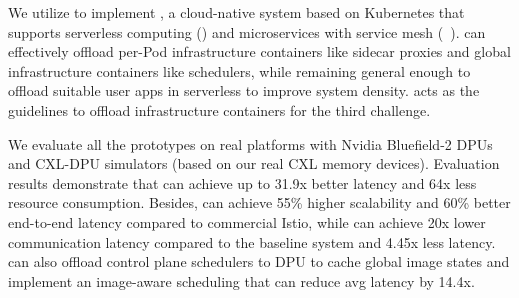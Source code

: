 We utilize \xpod to implement \sys, a cloud-native system based on Kubernetes that supports serverless computing (\faas) and microservices with service mesh (\mesh~\cite{istio}).
\sys can effectively offload per-Pod infrastructure containers like sidecar proxies and global infrastructure containers like schedulers, while remaining general enough to offload suitable user apps in serverless to improve system density.
\sys acts as the guidelines to offload infrastructure containers for the third challenge.

We evaluate all the prototypes on real platforms with Nvidia Bluefield-2 DPUs and CXL-DPU simulators (based on our real CXL memory devices).
Evaluation results demonstrate that \gsocket can achieve up to 31.9x better latency and 64x less resource consumption.
Besides, \mesh can achieve 55\% higher scalability and 60\% better end-to-end latency compared to commercial Istio,
while \faas can achieve 20x lower communication latency compared to the baseline system and 4.45x less latency.
\sys can also offload control plane schedulers to DPU to cache global image states and implement an image-aware scheduling that can reduce avg latency by 14.4x.


